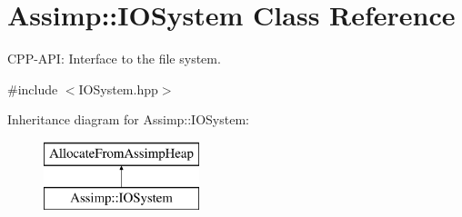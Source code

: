 \hypertarget{class_assimp_1_1_i_o_system}{\section{Assimp\-:\-:I\-O\-System Class Reference}
\label{class_assimp_1_1_i_o_system}
}


C\-P\-P-\/\-A\-P\-I\-: Interface to the file system.  




{\ttfamily \#include $<$I\-O\-System.\-hpp$>$}

Inheritance diagram for Assimp\-:\-:I\-O\-System\-:\begin{figure}[H]
\begin{center}
\leavevmode
\includegraphics[height=2.000000cm]{class_assimp_1_1_i_o_system}
\end{center}
\end{figure}
